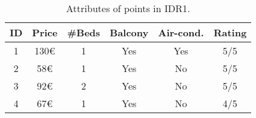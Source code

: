 \documentclass{vldb}
\begin{document}
\begin{table}[]
\centering
\caption{Attributes of points in IDR1.}
\label{tbl:attribs}
\begin{tabular}{|c|c|c|c|c|c|}
\hline
\textbf{ID} & \textbf{Price} & \textbf{\#Beds} & \textbf{Balcony} & \textbf{Air-cond.} & \textbf{Rating} \\ \hline
1                     & 130\euro           & 1               & Yes           & Yes                & 5/5             \\ \hline
2                     & 58\euro            & 1               & Yes           & No                 & 5/5             \\ \hline
3                     & 92\euro            & 2               & Yes           & No                 & 5/5             \\ \hline
4                     & 67\euro            & 1               & Yes           & No                 & 4/5             \\ \hline
\end{tabular}
\end{table}
\end{document}
